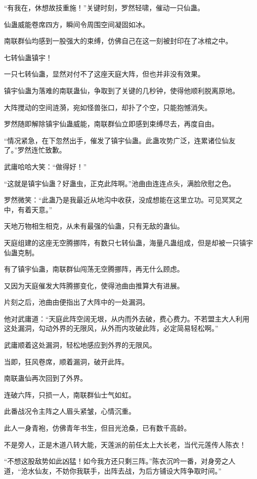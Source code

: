 \begin{this_body}
“有我在，休想故技重施！”关键时刻，罗然轻啸，催动一只仙蛊。

仙蛊威能卷席四方，瞬间令周围空间凝固如冰。

南联群仙均感到一股强大的束缚，仿佛自己在这一刻被封印在了冰棺之中。

七转仙蛊镇宇！

一只七转仙蛊，显然对付不了这座天庭大阵，但也并非没有效果。

镇宇仙蛊为落难的南联蛊仙，争取到了关键的几秒钟，使得他顺利脱离原地。

大阵搅动的空间涟漪，宛如怪兽张口，却扑了个空，只能抱憾消失。

罗然随即解除镇宇仙蛊威能，南联群仙立即感到束缚尽去，再度自由。

“情况紧急，在下忽然出手，催发了镇宇仙蛊。此蛊攻势广泛，连累诸位仙友了。”罗然连忙致歉。

武庸哈哈大笑：“做得好！”

“这就是镇宇仙蛊？好蛊虫，正克此阵啊。”池曲由连连点头，满脸欣慰之色。

罗然微笑：“此蛊乃是我最近从地沟中收获，没成想能在这里立功。可见冥冥之中，有着天意。”

天地万物相生相克，从未有最强的仙蛊，只有无敌的蛊仙。

天庭组建的这座无空腾挪阵，有数只七转仙蛊，海量凡蛊组成，但是却被一只镇宇仙蛊克制。

有了镇宇仙蛊，南联群仙闯荡无空腾挪阵，再无什么顾虑。

又因为天庭催发大阵腾挪变化，使得池曲由推算大有进展。

片刻之后，池曲由便指出了大阵中的一处漏洞。

他对武庸道：“天庭此阵空阔无垠，从内而外去破，费心费力。不若盟主大人利用这处漏洞，勾动外界的无限风，从外而内攻破此阵，必定简易轻松啊。”

武庸顺着这处漏洞，轻松地感应到外界的无限风。

当即，狂风卷席，顺着漏洞，破开此阵。

南联蛊仙再次回到了外界。

连破六阵，只损一人，南联群仙士气如虹。

此番战况令主阵之人眉头紧皱，心情沉重。

此人一身青袍，仿佛青年书生，但目光沧桑，已有数千高龄。

不是旁人，正是木道八转大能，天莲派的前任太上大长老，当代元莲传人陈衣！

“不想这股敌势如此凶猛！如今我方还只剩三阵。”陈衣沉吟一番，对身旁之人道，“沧水仙友，不妨你我联手，出阵去战，为后方铺设大阵争取时间。”


\end{this_body}
